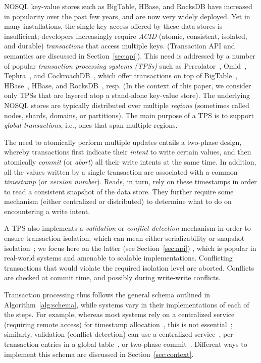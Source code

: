 
NOSQL key-value stores such as BigTable, HBase, and RocksDB have increased in popularity over the past few years, and are now very widely deployed. Yet in many installations, the single-key access offered by these data stores is insufficient; developers  increasingly require 
 \emph{ACID} (atomic, consistent, isolated, and durable) \emph{transactions} that access multiple keys.
 (Transaction API and semantics are discussed in Section~\ref{sec:api}).
This need is addressed by a number of popular  \emph{transaction processing systems (TPSs)} 
such as  Percolator~\cite{Percolator2010}, Omid~\cite{OmidICDE2014,omid-blog}, Tephra~\cite{tephra}, and CockroachDB~\cite{cockroach}, 
which offer transactions on top of  BigTable~\cite{bigtable-osdi06}, HBase~\cite{hbase}, HBase, and RocksDB~\cite{rocksdb}, resp. 
(In the context of this paper, we consider only TPSs that are layered atop a stand-alone key-value store). 
The underlying NOSQL stores are typically distributed  over multiple \emph{regions} (sometimes called nodes, shards, domains, or partitions).
The main purpose of a TPS is to support \emph{global transactions}, i.e., ones that span multiple regions.

The need to atomically perform multiple  updates  entails a two-phase design, whereby transactions first indicate their \emph{intent} to write certain values, and then atomically \emph{commit} (or \emph{abort}) all their write intents at the same time. In addition, 
all the values written by a single transaction are associated with a common  \emph{timestamp} (or \emph{version number}). 
Reads, in turn, rely on these timestamps in order to read a consistent snapshot of the data store. They further  
require some mechanism (either centralized or distributed) to determine what to do on encountering a write intent.

A TPS also implements  a \emph{validation} or \emph{conflict detection} mechanism in order to ensure transaction isolation, which can mean
either serializability or snapshot isolation~\cite{DBLP:conf/sigmod/BerensonBGMOO95}; we focus here on the
latter (see Section~\ref{sec:api}) ,  which is popular in real-world systems  and amenable to scalable implementations.
Conflicting transactions that would violate the required isolation level are
aborted. Conflicts are checked at commit time, and possibly during write-write conflicts.

Transaction processing thus follows the general schema outlined in Algorithm~\ref{alg:schema}, 
while systems vary in their implementations of each of the steps. 
For example, whereas most systems rely on a centralized service (requiring remote access) for timestamp allocation~\cite{OmidICDE2014,omid-blog,tephra,Percolator2010}, this is not essential~\cite{cockroach}; similarly, validation (conflict detection) can use a centralized service~\cite{OmidICDE2014,omid-blog,tephra}, per-transaction entries in a global table~\cite{cockroach}, or two-phase commit~\cite{Percolator2010}. 
Different ways to implement this schema are  discussed in Section~\ref{sec:context}.
 
